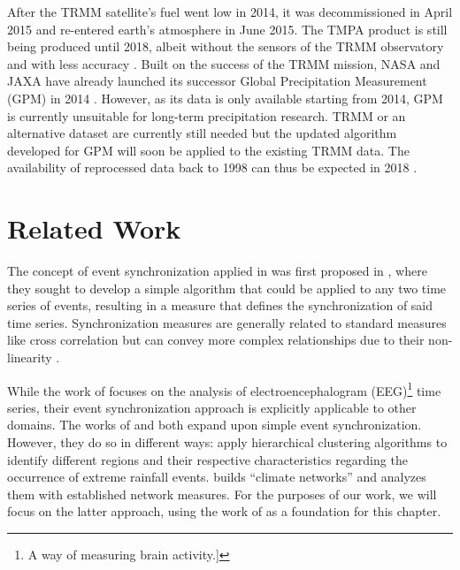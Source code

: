 After the TRMM satellite's fuel went low in 2014, it was decommissioned in April 2015 and re-entered earth's atmosphere in June 2015. The TMPA product is still being produced until 2018, albeit without the sensors of the TRMM observatory and with less accuracy \citep{Huffman.2017}. Built on the success of the TRMM mission, NASA and JAXA have already launched its successor Global Precipitation Measurement (GPM) in 2014 \citep{GoddardEarthScienceDataInformationandServicesCenter.2011}. However, as its data is only available starting from 2014, GPM is currently unsuitable for long-term precipitation research. TRMM or an alternative dataset are currently still needed but the updated algorithm developed for GPM will soon be applied to the existing TRMM data. The availability of reprocessed data back to 1998 can thus be expected in 2018 \citep{Huffman.2016}.


\clearpage
\section{Related Work}
The concept of event synchronization applied in \citet{Stolbova.2015} was first proposed in \citet{QuianQuiroga.2002}, where they sought to develop a simple algorithm that could be applied to any two time series of events, resulting in a measure that defines the synchronization of said time series. Synchronization measures are generally related to standard measures like cross correlation but can convey more complex relationships due to their non-linearity \citep{QuianQuiroga.2002}.

While the work of \citet{QuianQuiroga.2002} focuses on the analysis of electroencephalogram (EEG)\footnote{A way of measuring brain activity.]} time series, their event synchronization approach is explicitly applicable to other domains. The works of \citet{Malik.2010} and \citet{Stolbova.2015} both expand upon simple event synchronization. However, they do so in different ways: \citet{Malik.2010} apply hierarchical clustering algorithms to identify different regions and their respective characteristics regarding the occurrence of extreme rainfall events. \citet{Stolbova.2015} builds ``climate networks'' and analyzes them with established network measures. For the purposes of our work, we will focus on the latter approach, using the work of \citet{Stolbova.2015} as a foundation for this chapter.

